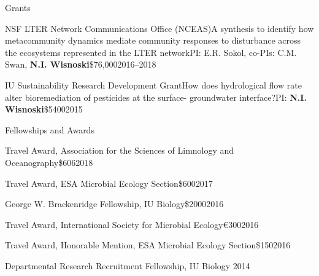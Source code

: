 \documentclass{resume} %
\begin{document}
\begin{rSection}{Grants}

\begin{Grant}{NSF LTER Network Communications Office (NCEAS)}{A synthesis to identify how metacommunity dynamics mediate community responses to disturbance across the ecosystems represented in the LTER network}{PI: E.R. Sokol, co-PIs: C.M. Swan, {\bf N.I. Wisnoski}}{\$76,000}{2016--2018}
\end{Grant}

\begin{Grant}{IU Sustainability Research Development Grant}{How does hydrological flow rate alter bioremediation of pesticides at the surface- groundwater interface?}{PI: {\bf N.I. Wisnoski}}{\$5400}{2015}
\end{Grant}

\end{rSection}

\bigskip


\begin{rSection}{Fellowships and Awards}

\begin{Award}{Travel Award, Association for the Sciences of Limnology and Oceanography}{\$606}{2018}
\end{Award}

\begin{Award}{Travel Award, ESA Microbial Ecology Section}{\$600}{2017}
\end{Award}

\begin{Award}{George W. Brackenridge Fellowship, IU Biology}{\$2000}{2016}
\end{Award}

\begin{Award}{Travel Award, International Society for Microbial Ecology}{\euro{}300}{2016}
\end{Award}

\begin{Award}{Travel Award, Honorable Mention, ESA Microbial Ecology Section}{\$150}{2016}
\end{Award}

\begin{Award}{Departmental Research Recruitment Fellowship, IU Biology}{ }{2014}
\end{Award}

\end{rSection}
\end{document}
